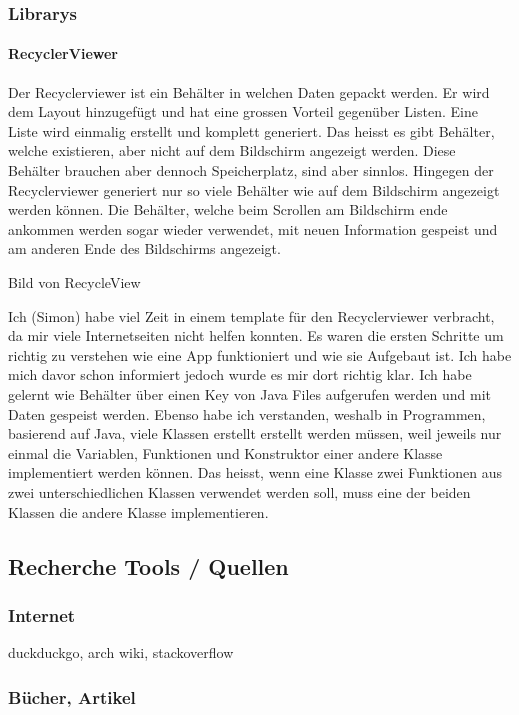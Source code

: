 \documentclass[a4paper,11pt]{article}
\begin{document}
\subsubsection{Librarys}

\paragraph{RecyclerViewer}

Der Recyclerviewer ist ein Behälter in welchen Daten gepackt werden. Er wird dem Layout hinzugefügt und hat eine grossen Vorteil gegenüber Listen. 
Eine Liste wird einmalig erstellt und komplett generiert. Das heisst es gibt Behälter, welche existieren, aber nicht auf dem Bildschirm angezeigt werden. 
Diese Behälter brauchen aber dennoch Speicherplatz, sind aber sinnlos. Hingegen der Recyclerviewer generiert nur so viele Behälter wie auf dem Bildschirm angezeigt werden können. 
Die Behälter, welche beim Scrollen am Bildschirm ende ankommen werden sogar wieder verwendet, mit neuen Information gespeist und am anderen Ende des Bildschirms angezeigt.

Bild von RecycleView

Ich (Simon) habe viel Zeit in einem template für den Recyclerviewer verbracht, da mir viele Internetseiten nicht helfen konnten. Es waren die ersten Schritte um 
richtig zu verstehen wie eine App funktioniert und wie sie Aufgebaut ist. Ich habe mich davor schon informiert jedoch wurde es mir dort richtig klar. Ich habe gelernt
wie Behälter über einen Key von Java Files aufgerufen werden und mit Daten gespeist werden. Ebenso habe ich verstanden, weshalb in Programmen, basierend auf Java, viele 
Klassen erstellt erstellt werden müssen, weil jeweils nur einmal die Variablen, Funktionen und Konstruktor einer andere Klasse implementiert werden können. Das heisst, 
wenn eine Klasse zwei Funktionen aus zwei unterschiedlichen Klassen verwendet werden soll, muss eine der beiden Klassen die andere Klasse implementieren. 

\subsection{Recherche Tools / Quellen}
\subsubsection{Internet}
duckduckgo, arch wiki, stackoverflow
\subsubsection{Bücher, Artikel}
\end{document}
